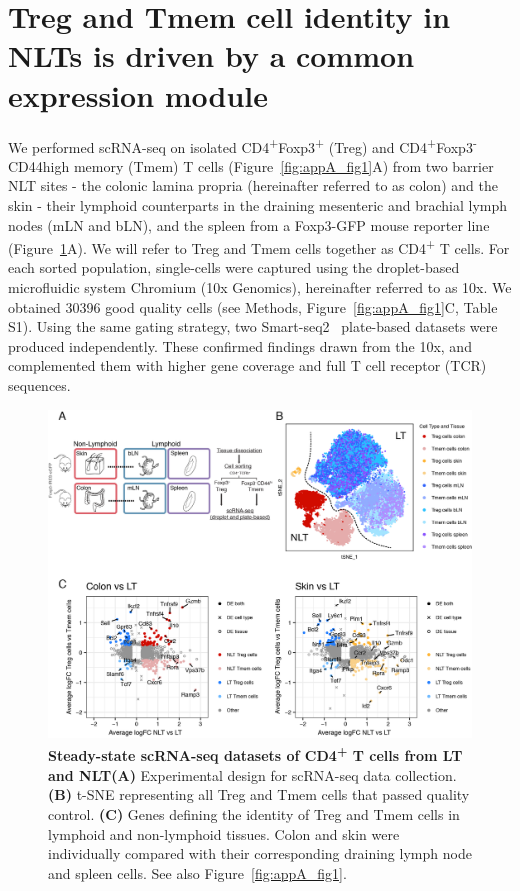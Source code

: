 \section{Treg and Tmem cell identity in NLTs is driven by a common expression module}
\label{section2.2}
We performed scRNA-seq on isolated CD4\textsuperscript{+}Foxp3\textsuperscript{+} (Treg) and CD4\textsuperscript{+}Foxp3\textsuperscript{-}CD44high memory (Tmem) T cells (Figure~\ref{fig:appA_fig1}A) from two barrier NLT sites - the colonic lamina propria (hereinafter referred to as colon) and the skin - their lymphoid counterparts in the draining mesenteric and brachial lymph nodes (mLN and bLN), and the spleen from a Foxp3-GFP mouse reporter line~\citep{Bettelli2006-dw} (Figure~\ref{fig:chap2_fig1}A). We will refer to Treg and Tmem cells together as CD4\textsuperscript{+} T cells. For each sorted population, single-cells were captured using the droplet-based microfluidic system Chromium (10x Genomics), hereinafter referred to as 10x. We obtained 30396 good quality cells (see Methods, Figure~\ref{fig:appA_fig1}C, Table S1). Using the same gating strategy, two Smart-seq2~\citep{picelli_full-length_2014} plate-based datasets were produced independently. These confirmed findings drawn from the 10x, and complemented them with higher gene coverage and full T cell receptor (TCR) sequences.

\begin{figure}[ht!] 
\centering    
\includegraphics[width=1.0\textwidth]{Chapter2/Figs/chap2_fig1.png} %
\caption[Steady-state scRNA-seq datasets of CD4\textsuperscript{+} T cells from LT and NLT]{\textbf{Steady-state scRNA-seq datasets of CD4\textsuperscript{+} T cells from LT and NLT}\newline\textbf{(A)} Experimental design for scRNA-seq data collection. \textbf{(B)} t-SNE representing all Treg and Tmem cells that passed quality control. \textbf{(C)} Genes defining the identity of Treg and Tmem cells in lymphoid and non-lymphoid tissues. Colon and skin were individually compared with their corresponding draining lymph node and spleen cells. See also Figure~\ref{fig:appA_fig1}.}
\label{fig:chap2_fig1}
\end{figure}

